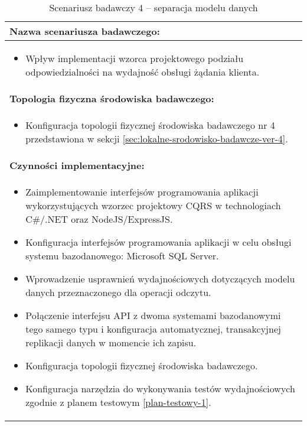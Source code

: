\setlength{\LTcapwidth}{\textwidth}
\setlength\LTleft{0pt}
\setlength\LTright{0pt}
\begin{longtable}[c]{|llll|}
    \caption{Scenariusz badawczy 4 -- separacja modelu danych}
    \label{tab:research-scenario-4}                                                  \\ \hline
    \multicolumn{4}{|l|}{\textbf{Nazwa scenariusza badawczego:}}                     \\ \hline
    \multicolumn{4}{|p{\linewidth}|}{
        \begin{itemize}[label={}]
            \item Wpływ implementacji wzorca projektowego podziału odpowiedzialności na wydajność obsługi żądania klienta.
          \end{itemize}
    } \\ \hline
    \multicolumn{4}{|l|}{\textbf{Topologia fizyczna środowiska badawczego:}}         \\ \hline
    \multicolumn{4}{|p{\linewidth}|}{
        \begin{itemize}[label={}]
            \item Konfiguracja topologii fizycznej środowiska badawczego nr 4 przedstawiona w sekcji \ref{sec:lokalne-srodowisko-badawcze-ver-4}.
          \end{itemize}
    }\\ \hline
    \multicolumn{4}{|l|}{\textbf{Czynności implementacyjne:}}                        \\ \hline
    \multicolumn{4}{|p{\linewidth}|}{
        \begin{itemize}
            \item Zaimplementowanie interfejsów programowania aplikacji wykorzystujących wzorzec projektowy CQRS w technologiach C\#/.NET oraz NodeJS/ExpressJS.
            \item Konfiguracja interfejsów programowania aplikacji w celu obsługi systemu bazodanowego: Microsoft SQL Server.
            \item Wprowadzenie usprawnień wydajnościowych dotyczących modelu danych przeznaczonego dla operacji odczytu.
            \item Połączenie interfejsu API z dwoma systemami bazodanowymi tego samego typu i konfiguracja automatycznej, transakcyjnej replikacji danych w momencie ich zapisu.
            \item Konfiguracja topologii fizycznej środowiska badawczego.
            \item Konfiguracja narzędzia do wykonywania testów wydajnościowych zgodnie z planem testowym \ref{plan-testowy-1}.

\end{itemize}}
\end{longtable}
